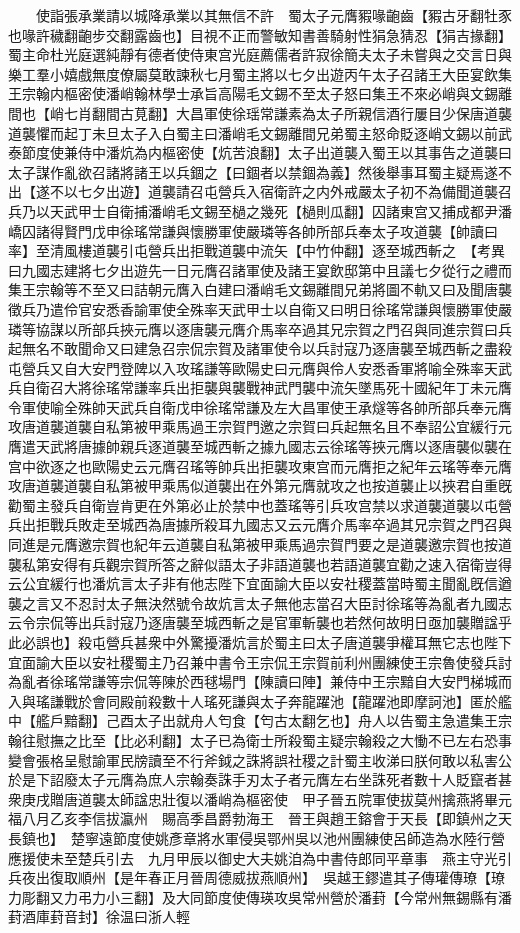 　　使詣張承業請以城降承業以其無信不許　蜀太子元膺豭喙齙齒【豭古牙翻牡豕也喙許穢翻齙步交翻露齒也】目視不正而警敏知書善騎射性狷急猜忍【狷吉掾翻】蜀主命杜光庭選純靜有德者使侍東宫光庭薦儒者許寂徐簡夫太子未嘗與之交言日與樂工羣小嬉戲無度僚屬莫敢諫秋七月蜀主將以七夕出遊丙午太子召諸王大臣宴飲集王宗翰内樞密使潘峭翰林學士承旨高陽毛文錫不至太子怒曰集王不來必峭與文錫離間也【峭七肖翻間古莧翻】大昌軍使徐瑶常謙素為太子所親信酒行屢目少保唐道襲道襲懼而起丁未旦太子入白蜀主曰潘峭毛文錫離間兄弟蜀主怒命貶逐峭文錫以前武泰節度使兼侍中潘炕為内樞密使【炕苦浪翻】太子出道襲入蜀王以其事告之道襲曰太子謀作亂欲召諸將諸王以兵錮之【曰錮者以禁錮為義】然後舉事耳蜀主疑焉遂不出【遂不以七夕出遊】道襲請召屯營兵入宿衛許之内外戒嚴太子初不為備聞道襲召兵乃以天武甲士自衛捕潘峭毛文錫至檛之幾死【檛則瓜翻】囚諸東宫又捕成都尹潘嶠囚諸得賢門戊申徐瑤常謙與懷勝軍使嚴璘等各帥所部兵奉太子攻道襲【帥讀曰率】至清風樓道襲引屯營兵出拒戰道襲中流矢【中竹仲翻】逐至城西斬之　【考異曰九國志建將七夕出遊先一日元膺召諸軍使及諸王宴飲邸第中且議七夕從行之禮而集王宗翰等不至又曰詰朝元膺入白建曰潘峭毛文錫離間兄弟將圖不軌又曰及聞唐襲徵兵乃遣伶官安悉香諭軍使全殊率天武甲士以自衛又曰明日徐瑤常謙與懷勝軍使嚴璘等協謀以所部兵挾元膺以逐唐襲元膺介馬率卒過其兄宗賀之門召與同進宗賀曰兵起無名不敢聞命又曰建急召宗侃宗賀及諸軍使令以兵討寇乃逐唐襲至城西斬之盡殺屯營兵又自大安門登陴以入攻瑤謙等歐陽史曰元膺與伶人安悉香軍將喻全殊率天武兵自衛召大將徐瑤常謙率兵出拒襲與襲戰神武門襲中流矢墜馬死十國紀年丁未元膺令軍使喻全殊帥天武兵自衛戊申徐瑤常謙及左大昌軍使王承燧等各帥所部兵奉元膺攻唐道襲道襲自私第被甲乘馬過王宗賀門邀之宗賀曰兵起無名且不奉詔公宜緩行元膺遣天武將唐據帥親兵逐道襲至城西斬之據九國志云徐瑤等挾元膺以逐唐襲似襲在宫中欲逐之也歐陽史云元膺召瑤等帥兵出拒襲攻東宫而元膺拒之紀年云瑤等奉元膺攻唐道襲道襲自私第被甲乘馬似道襲出在外第元膺就攻之也按道襲止以挾君自重旣勸蜀主發兵自衛豈肯更在外第必止於禁中也蓋瑤等引兵攻宫禁以求道襲道襲以屯營兵出拒戰兵敗走至城西為唐據所殺耳九國志又云元膺介馬率卒過其兄宗賀之門召與同進是元膺邀宗賀也紀年云道襲自私第被甲乘馬過宗賀門要之是道襲邀宗賀也按道襲私第安得有兵觀宗賀所答之辭似語太子非語道襲也若語道襲宜勸之速入宿衛豈得云公宜緩行也潘炕言太子非有他志陛下宜面諭大臣以安社稷蓋當時蜀主聞亂旣信遒襲之言又不忍討太子無決然號令故炕言太子無他志當召大臣討徐瑤等為亂者九國志云令宗侃等出兵討寇乃逐唐襲至城西斬之是官軍斬襲也若然何故明日亟加襲贈諡乎此必誤也】殺屯營兵甚衆中外驚擾潘炕言於蜀主曰太子唐道襲爭權耳無它志也陛下宜面諭大臣以安社稷蜀主乃召兼中書令王宗侃王宗賀前利州團練使王宗魯使發兵討為亂者徐瑤常謙等宗侃等陳於西毬場門【陳讀曰陣】兼侍中王宗黯自大安門梯城而入與瑤謙戰於會同殿前殺數十人瑤死謙與太子奔龍躍池【龍躍池即摩訶池】匿於艦中【艦戶黯翻】己酉太子出就舟人匄食【匄古太翻乞也】舟人以告蜀主急遣集王宗翰往慰撫之比至【比必利翻】太子已為衛士所殺蜀主疑宗翰殺之大慟不已左右恐事變會張格呈慰諭軍民牓讀至不行斧鉞之誅將誤社稷之計蜀主收涕曰朕何敢以私害公於是下詔廢太子元膺為庶人宗翰奏誅手刃太子者元膺左右坐誅死者數十人貶竄者甚衆庚戌贈唐道襲太師諡忠壯復以潘峭為樞密使　甲子晉五院軍使拔莫州擒燕將畢元福八月乙亥李信拔瀛州　賜高季昌爵勃海王　晉王與趙王鎔會于天長【即鎮州之天長鎮也】　楚寧遠節度使姚彥章將水軍侵吳鄂州吳以池州團練使呂師造為水陸行營應援使未至楚兵引去　九月甲辰以御史大夫姚洎為中書侍郎同平章事　燕主守光引兵夜出復取順州【是年春正月晉周德威拔燕順州】　吳越王鏐遣其子傳瓘傳璙【璙力彫翻又力弔力小三翻】及大同節度使傳瑛攻吳常州營於潘葑【今常州無錫縣有潘葑酒庫葑音封】徐温曰浙人輕